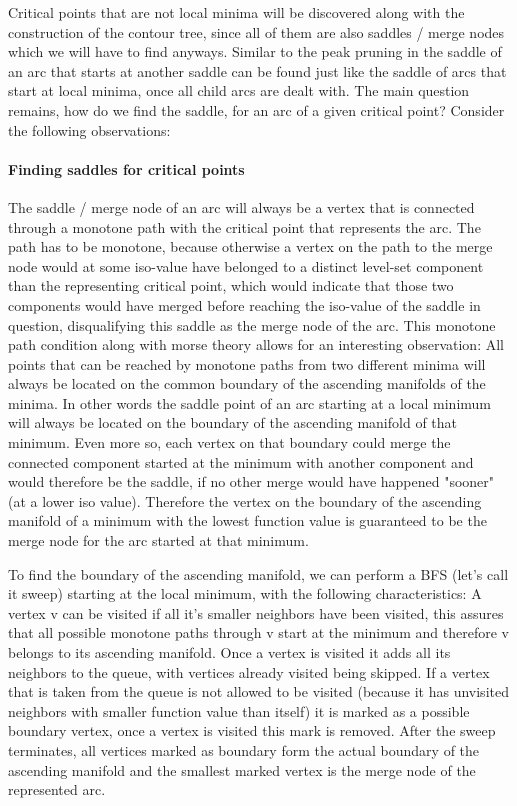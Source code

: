 \documentclass{scrartcl}
\begin{document}
Critical points that are not local minima will be discovered along with the construction of the contour tree, since all of them are also saddles / merge nodes which we will have to find anyways. Similar to the peak pruning in \cite{Carr} the saddle of an arc that starts at another saddle can be found just like the saddle of arcs that start at local minima, once all child arcs are dealt with. The main question remains, how do we find the saddle, for an arc of a given critical point? Consider the following observations:

\paragraph{Finding saddles for critical points}
The saddle / merge node of an arc will always be a vertex that is connected through a monotone path with the critical point that represents the arc. The path has to be monotone, because otherwise a vertex on the path to the merge node would at some iso-value have belonged to a distinct level-set component than the representing critical point, which would indicate that those two components would have merged before reaching the iso-value of the saddle in question, disqualifying this saddle as the merge node of the arc. This monotone path condition along with morse theory allows for an interesting observation: All points that can be reached by monotone paths from two different minima will always be located on the common boundary of the ascending manifolds of the minima. In other words the saddle point of an arc starting at a local minimum will always be located on the boundary of the ascending manifold of that minimum. Even more so, each vertex on that boundary could merge the connected component started at the minimum with another component and would therefore be the saddle, if no other merge would have happened "sooner" (at a lower iso value). Therefore the vertex on the boundary of the ascending manifold of a minimum with the lowest function value is guaranteed to be the merge node for the arc started at that minimum. 

To find the boundary of the ascending manifold, we can perform a BFS (let's call it sweep) starting at the local minimum, with the following characteristics:
A vertex v can be visited if all it's smaller neighbors have been visited, this assures that all possible monotone paths through v start at the minimum and therefore v belongs to its ascending manifold. Once a vertex is visited it adds all its neighbors to the queue, with vertices already visited being skipped. If a vertex that is taken from the queue is not allowed to be visited (because it has unvisited neighbors with smaller function value than itself) it is marked as a possible boundary vertex, once a vertex is visited this mark is removed. After the sweep terminates, all vertices marked as boundary form the actual boundary of the ascending manifold and the smallest marked vertex is the merge node of the represented arc. 
\end{document}
